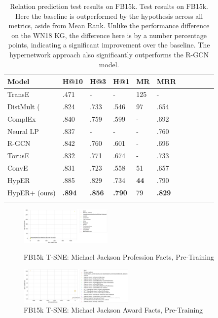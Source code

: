 \begin{table}[H]
		\centering
		\begin{tabular}{lllllllllll}
  			\textbf{Model} & \textbf{H@10} & \textbf{H@3} & \textbf{H@1} & \textbf{MR} & \textbf{MRR} \\
  			\hline
  			TransE \unskip~\citep{bordes2013translating} & .471 & - & - & 125 & - \\
  			DistMult (\unskip~\citep{yang2014embedding} & .824 & .733 & .546 & 97 & .654 \\
  			ComplEx \unskip~\citep{trouillon2016complex} & .840 & .759 & .599 & - & .692 \\
  			Neural LP \unskip~\citep{yang2017differentiable} & .837 & - & - & - & .760 \\
			R-GCN \unskip~\citep{schlichtkrull2018modeling} & .842 & .760 & .601 & - & .696 \\
			TorusE \unskip~\citep{ebisu2018toruse}  & .832 & .771 & .674 & - & .733\\
			ConvE \unskip~\citep{dettmers2018convolutional}  & .831 & .723 & .558 & 51 & .657 \\
			HypER \unskip~\citep{balazevic2019hypernetwork} & .885 & .829 & .734 & \textbf{44} & .790 \\
  			\hline
  			HypER+ (ours) & \textbf{.894} & \textbf{.856} & \textbf{.790} & 79 & \textbf{.829} \\
			&
		\end{tabular}
		\captionsetup{justification=centering}
		\caption{Relation prediction test results on FB15k. Test results on FB15k. Here the baseline is outperformed by the hypothesis across all metrics, aside from Mean Rank. Unlike the performance difference on the WN18 KG, the difference here is by a number percentage points, indicating a significant improvement over the baseline. The hypernetwork approach also significantly outperforms the R-GCN model.}
\end{table}


\begin{figure}[H]
	\parbox{.5\linewidth}{
   		\centering
    		\includegraphics[width=0.4\textwidth, height=0.2\textheight]{t_sne_train_profession}
		\captionsetup{justification=centering}
		\caption{FB15k T-SNE: Michael Jackson Profession Facts, Pre-Training}
		}
	\hfill
	\parbox{.5\linewidth}{
   		\centering
		\includegraphics[width=0.5\textwidth, height=0.2\textheight]{t_sne_train_award}
		\captionsetup{justification=centering}
		\caption{FB15k T-SNE: Michael Jackson Award Facts, Pre-Training}
		}
\end{figure}

